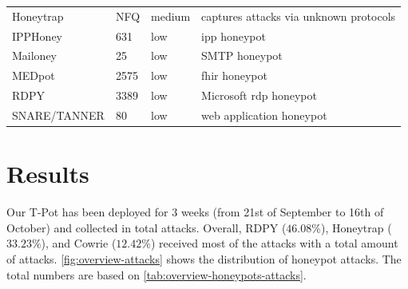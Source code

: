 \begin{table}
\begin{tabularx}{\linewidth}{l|XlX}
        Honeytrap \cite{honeytrap2021}            & NFQ                                                                                                         & medium                     & captures attacks via unknown protocols                                               \\
        IPPHoney \cite{ipphoney2021}              & 631                                                                                                         & low                        & \ac{ipp} honeypot                                                                    \\
        Mailoney \cite{mailoney2021}              & 25                                                                                                          & low                        & SMTP honeypot                                                                        \\
        MEDpot \cite{medpot2021}                  & 2575                                                                                                        & low                        & \ac{fhir} honeypot                                                                   \\
        RDPY \cite{rdpy2021}                      & 3389                                                                                                        & low                        & Microsoft \ac{rdp} honeypot                                                          \\
        SNARE/TANNER \cite{snare2021}             & 80                                                                                                          & low                        & web application honeypot                                                             \\
        \bottomrule
    \end{tabularx}
    \label{tab:overview-honeypots}
\end{table}

\section{Results}
\label{sec:honeypots-heicloud}

Our T-Pot has been deployed for 3 weeks (from 21st of September to 16th of October) and collected in total  attacks.
Overall, RDPY ($46.08\%$), Honeytrap ($33.23\%$), and Cowrie ($12.42\%$) received most of the attacks with a total amount of  attacks.
\autoref{fig:overview-attacks} shows the distribution of honeypot attacks.
The total numbers are based on \autoref{tab:overview-honeypots-attacks}.

